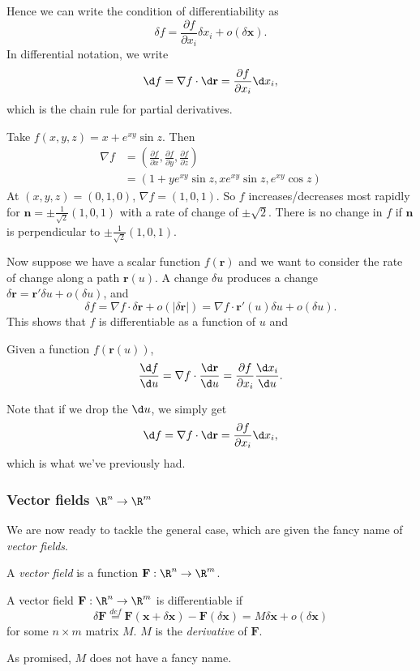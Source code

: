 \documentclass[a4paper]{article}
\begin{document}
Hence we can write the condition of differentiability as
\[
  \delta f = \frac{\partial f}{\partial x_i}\delta x_i + o(\delta \mathbf{x}).
\]
In differential notation, we write
\[
  \d f = \nabla f\cdot \d \mathbf{r} = \frac{\partial f}{\partial x_i}\d x_i,
\]
which is the chain rule for partial derivatives.

\begin{eg}
  Take $f(x, y, z) = x + e^{xy}\sin z$. Then
  \begin{align*}
    \nabla f &= \left(\frac{\partial f}{\partial x}, \frac{\partial f}{\partial y}, \frac{\partial f}{\partial z}\right)\\
    &= (1 + ye^{xy}\sin z, xe^{xy}\sin z, e^{xy}\cos z)
  \end{align*}
  At  $(x, y, z) = (0, 1, 0)$, $\nabla f = (1, 0, 1)$. So $f$ increases/decreases most rapidly for $\mathbf{n} = \pm \frac{1}{\sqrt{2}}(1, 0, 1)$ with a rate of change of $\pm \sqrt{2}$. There is no change in $f$ if $\mathbf{n}$ is perpendicular to $\pm \frac{1}{\sqrt{2}}(1, 0, 1)$.
\end{eg}

Now suppose we have a scalar function $f(\mathbf{r})$ and we want to consider the rate of change along a path $\mathbf{r}(u)$. A change $\delta u$ produces a change $\delta \mathbf{r} = \mathbf{r}' \delta u + o(\delta u)$, and
\[
  \delta f = \nabla f\cdot \delta \mathbf{r} + o(|\delta \mathbf{r}|) = \nabla f\cdot \mathbf{r}'(u)\delta u + o(\delta u).
\]
This shows that $f$ is differentiable as a function of $u$ and
\begin{thm}
  Given a function $f(\mathbf{r}(u))$,
  \[
    \frac{\d f}{\d u} = \nabla f\cdot \frac{\d \mathbf{r}}{\d u} = \frac{\partial f}{\partial x_i} \frac{\d x_i}{\d u}.
  \]
\end{thm}
Note that if we drop the $\d u$, we simply get
\[
  \d f = \nabla f\cdot \d \mathbf{r} = \frac{\partial f}{\partial x_i}\d x_i,
\]
which is what we've previously had.
\subsubsection*{Vector fields \texorpdfstring{$\R^n\to \R^m$}{Rn to Rm}}
We are now ready to tackle the general case, which are given the fancy name of \emph{vector fields}.
\begin{defi}
  A \emph{vector field} is a function $\mathbf{F}: \R^n\to \R^m$.
\end{defi}

\begin{defi}
  A vector field $\mathbf{F}: \R^n \to \R^m$ is differentiable if
  \[
    \delta \mathbf{F} \stackrel{def}{=} \mathbf{F}(\mathbf{x} + \delta\mathbf{x}) - \mathbf{F}(\delta\mathbf{x}) = M\delta\mathbf{x} + o(\delta \mathbf{x})
  \]
  for some $n\times m$ matrix $M$. $M$ is the \emph{derivative} of $\mathbf{F}$.
\end{defi}
As promised, $M$ does not have a fancy name.
\end{document}
